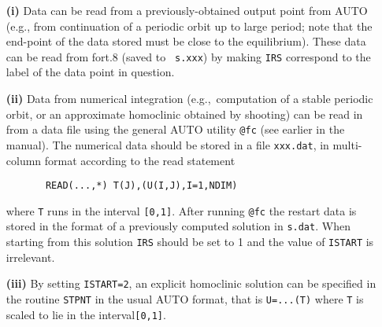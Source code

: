 \documentclass[12pt]{report}
\begin{document}
\begin{itemize}

\item[{\bf(i)}]
Data can be read from a previously-obtained output point from {\cal AUTO}
 (e.g., from continuation of a periodic orbit up to large period;
note that the end-point of the data stored must be close to the
equilibrium). These data can be read from fort.8 (saved to {\tt
s.xxx}) by making {\tt IRS} correspond to the label of the data
point in question.

\item[{\bf(ii)}]
Data from numerical integration (e.g.,\ computation of a stable
periodic orbit, or an approximate homoclinic obtained by shooting)  
can be read in from a data file using the general {\cal AUTO} 
utility {\tt @fc} (see earlier in the manual). 
The  numerical data should be stored in
a file  {\tt xxx.dat}, in multi-column format according to the read statement
\begin{verbatim}
       READ(...,*) T(J),(U(I,J),I=1,NDIM)
\end{verbatim}
where {\tt T} runs in the interval {\tt [0,1]}.
After running {\tt @fc} the restart data is stored in
the format of a previously computed solution in {\tt s.dat}.
When starting from this solution {\tt IRS} should be set to 1 and 
the value of {\tt ISTART} is irrelevant.

\item[{\bf(iii)}]
By setting {\tt ISTART=2},  
an explicit homoclinic solution can be specified in the routine {\tt STPNT} 
in the usual {\cal AUTO} format, that is 
{\tt U=...(T)} where {\tt T} is scaled to lie in the
interval{\tt [0,1]}. 


\end{itemize}
\end{document}

